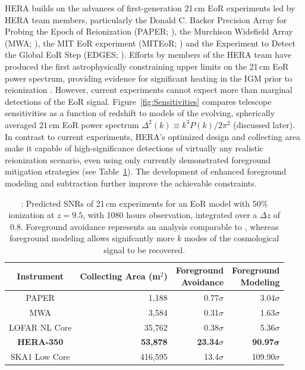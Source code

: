 \documentclass[preprint,11pt]{aastex}
\newcommand{\Caption}[4]{\vspace{#1}\renewcommand{\baselinestretch}{#2}\caption{#4}\vspace{#3}}
\begin{document}
HERA builds on the advances of first-generation
21\,cm EoR experiments led by HERA team members, particularly 
the Donald C. Backer Precision Array for Probing the Epoch of Reionization (PAPER; \citealt{parsons_et_al2010}),
the Murchison Widefield Array (MWA; \citealt{bowman_et_al2012,tingay_et_al2013}),
the MIT EoR experiment (MITEoR; \citealt{zheng_et_al2014}) and the Experiment to Detect the Global EoR Step (EDGES; \citealt{bowman_rogers2010}).  
Efforts by members of the HERA team
have produced the first astrophysically constraining upper limits on the 21\,cm EoR power spectrum, 
providing evidence for significant heating in the IGM prior to reionization \citep{parsons_etal2014,ali_et_al2015,pober_et_al2015}.
However, current experiments cannot expect more than marginal detections of the EoR signal. 
Figure~\ref{fig:Sensitivities} compares telescope sensitivities as a function of redshift to models of 
the evolving, spherically averaged 21\,cm EoR power spectrum $\Delta^2 (k) \equiv k^3 P(k) / 2 \pi^2$ (discussed later).  In contrast to current experiments,
HERA's optimized design and collecting area make it capable of
high-significance detections of virtually any realistic reionization scenario, even using only currently demonstrated foreground
mitigation strategies (see Table~\ref{tab:signif}). The development of enhanced foreground modeling and subtraction further improve the achievable constraints.


\begin{table}
\caption{\hspace{-1.2mm}: Predicted SNRs of 21\,cm experiments for an EoR model with 50\% ionization at $z=9.5$, with 1080 hours observation, integrated over a $\Delta z$ of $0.8$.
Foreground avoidance represents an analysis comparable to \cite{ali_et_al2015}, whereas foreground modeling allows signifcantly more $k$ modes of the cosmological signal to be recovered.}
\small
 \centering
 \begin{tabular}{c||r||r|r} 
\hline
Instrument & \shortstack{Collecting \\ Area (m$^2$)} & \shortstack{Foreground \\Avoidance} & \shortstack{Foreground \\Modeling} \\
\hline
PAPER & 1,188 & 0.77$\sigma$ & 3.04$\sigma$ \\
MWA & 3,584 & 0.31$\sigma$ & 1.63$\sigma$ \\
LOFAR NL Core & 35,762 & 0.38$\sigma$ & 5.36$\sigma$ \\
\textbf{HERA-350} & \textbf{53,878} & \textbf{23.34$\sigma$} & \textbf{90.97}$\boldsymbol{\sigma}$ \\
SKA1 Low Core & 416,595 & 13.4$\sigma$ & 109.90$\sigma$
\end{tabular}
\hspace{-0.1in}
\label{tab:signif}
\end{table}
\end{document}
